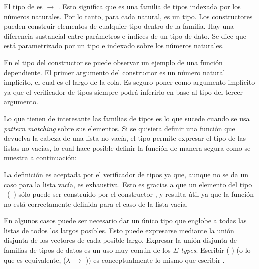 El tipo de   es  $\rightarrow$ . Esto significa que   es una familia de tipos indexada por los números naturales. Por lo tanto, para cada  natural,   es un tipo. Los constructores pueden construir elementos de cualquier tipo dentro de la familia. Hay una diferencia sustancial entre parámetros e índices de un tipo de dato. Se dice que  está parametrizado por un tipo  e indexado sobre los números naturales. 

En el tipo del constructor \AgdaInductiveConstructor{\_::\_} se puede observar un ejemplo de una función dependiente. El primer argumento del constructor es un número natural  implícito, el cual es el largo de la cola. Es seguro poner  como argumento implícito ya que el verificador de tipos siempre podrá inferirlo en base al tipo del tercer argumento. 

Lo que tienen de interesante las familias de tipos es lo que sucede cuando se usa \textit{pattern matching} sobre sus elementos. Si se quisiera definir una función que devuelva la cabeza de una lista no vacía, el tipo  permite expresar el tipo de las listas no vacías, lo cual hace posible definir la función  de manera segura como se muestra a continuación: 


La definición es aceptada por el verificador de tipos ya que, aunque no se da un caso para la lista vacía, es exhaustiva. Esto es gracias a que un elemento del tipo \mbox{  ( )} sólo puede ser construído por el constructor \AgdaInductiveConstructor{\_::\_}, y resulta útil ya que la función  no está correctamente definida para el caso de la lista vacía.  

En algunos casos puede ser necesario dar un único tipo que englobe a todas las listas de todos los largos posibles. Esto puede expresarse mediante la unión disjunta de los vectores de cada posible largo. Expresar la unión disjunta de familias de tipos de datos es un uso muy común de los $\Sigma$\textit{-types}. Escribir  ( ) (o lo que es equivalente,  ($\lambda$  $\rightarrow$  )) es conceptualmente lo mismo que escribir  . 

